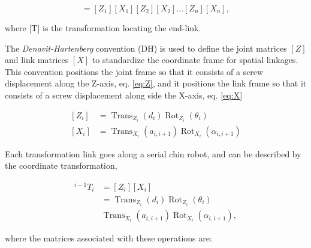 \begin{equation}
    [T] = [Z_1][X_1][Z_2][X_2]\ldots[Z_n][X_n],
    \label{eq:T}
\end{equation}

where [T] is the transformation locating the end-link.

The \textit{Denavit-Hartenberg} convention (DH) is used to define the joint matrices $[Z]$ and link matrices $[X]$ to standardize the coordinate frame for spatial linkages. This convention positions the joint frame so that it consists of a screw displacement along the Z-axis, eq. \eqref{eq:Z}, and it positions the link frame so that it consists of a screw displacement along side the X-axis, eq. \eqref{eq:X}

\begin{subequations}
    \begin{align}
        [Z_{i}]&=\operatorname{Trans}_{{Z_{{i}}}}(d_{i})\operatorname{Rot}_{{Z_{{i}}}}(\theta _{i})
        \label{eq:Z} \\
        [X_{i}]&=\operatorname {Trans}_{{X_{i}}}(a_{{i,i+1}})\operatorname {Rot}_{{X_{i}}}(\alpha _{{i,i+1}})
        \label{eq:X}
    \end{align}
\end{subequations}

Each transformation link goes along a serial chin robot, and can be described by the coordinate transformation,

\begin{equation}
\begin{split}
    {}^{{i-1}}T_{{i}} & =[Z_{i}][X_{i}] \\ & =\operatorname {Trans}_{{Z_{{i}}}}(d_{i})\operatorname {Rot}_{{Z_{{i}}}}(\theta _{i}) \\ & \operatorname {Trans}_{{X_{i}}}(a_{{i,i+1}})\operatorname {Rot}_{{X_{i}}}(\alpha _{{i,i+1}}),
    \end{split}
\end{equation}

where the matrices associated with these operations are:

